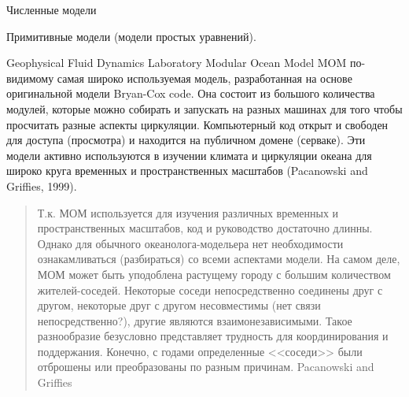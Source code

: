 \begin{chapter}{Численные модели}
\begin{section}{Примитивные модели (модели простых уравнений).}
\begin{paragraph}{Geophysical Fluid Dynamics Laboratory Modular Ocean Model MOM}
по-видимому самая широко используемая модель, разработанная на основе
оригинальной модели Bryan-Cox code. Она состоит из большого количества
модулей, которые можно собирать и запускать на разных машинах для того
чтобы просчитать разные аспекты циркуляции. Компьютерный код открыт и
свободен для доступа (просмотра) и находится на публичном домене
(серваке). Эти модели активно используются в изучении климата и
циркуляции океана для широко круга временных и пространственных
масштабов (Pacanowski and Griffies, 1999).
% 
\begin{quote}
Т.к. МОМ используется для изучения различных временных и
пространственных масштабов, код и руководство достаточно
длинны. Однако для обычного океанолога-модельера нет необходимости
ознакамливаться (разбираться) со всеми аспектами модели. На самом
деле, МОМ может быть уподоблена растущему городу с большим количеством
жителей-соседей. Некоторые соседи непосредственно соединены друг с
другом, некоторые друг с другом несовместимы (нет связи
непосредственно?), другие являются взаимонезависимыми. Такое
разнообразие безусловно представляет трудность для координирования и
поддержания. Конечно, с годами определенные <<соседи>> были отброшены
или преобразованы по разным причинам. Pacanowski and Griffies
%
\end{quote}


\end{paragraph}
\end{section}
\end{chapter}
